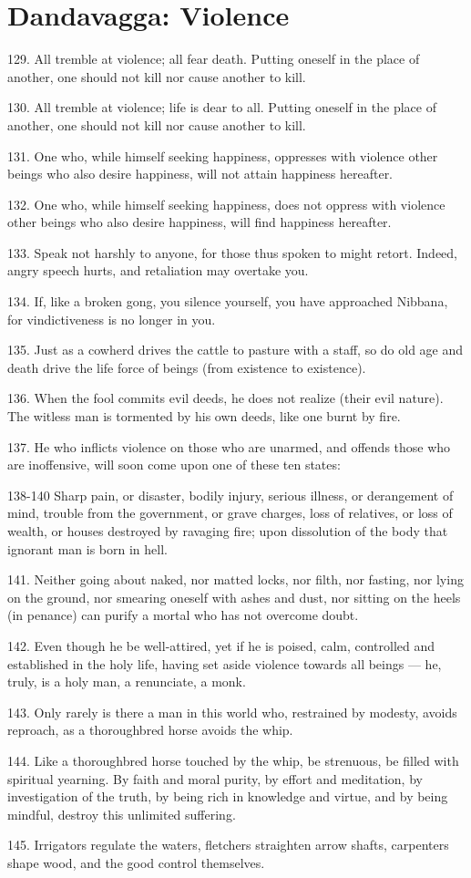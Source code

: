\newpage
\chapter{Dandavagga: Violence}

129. All tremble at violence; all fear death. Putting oneself in the place of another, one should not kill nor cause another to kill.

130. All tremble at violence; life is dear to all. Putting oneself in the place of another, one should not kill nor cause another to kill.

131. One who, while himself seeking happiness, oppresses with violence other beings who also desire happiness, will not attain happiness hereafter.

132. One who, while himself seeking happiness, does not oppress with violence other beings who also desire happiness, will find happiness hereafter.

133. Speak not harshly to anyone, for those thus spoken to might retort. Indeed, angry speech hurts, and retaliation may overtake you.

134. If, like a broken gong, you silence yourself, you have approached Nibbana, for vindictiveness is no longer in you.

135. Just as a cowherd drives the cattle to pasture with a staff, so do old age and death drive the life force of beings (from existence to existence).

136. When the fool commits evil deeds, he does not realize (their evil nature). The witless man is tormented by his own deeds, like one burnt by fire.

137. He who inflicts violence on those who are unarmed, and offends those who are inoffensive, will soon come upon one of these ten states:

138-140 Sharp pain, or disaster, bodily injury, serious illness, or derangement of mind, trouble from the government, or grave charges, loss of relatives, or loss of wealth, or houses destroyed by ravaging fire; upon dissolution of the body that ignorant man is born in hell.

141. Neither going about naked, nor matted locks, nor filth, nor fasting, nor lying on the ground, nor smearing oneself with ashes and dust, nor sitting on the heels (in penance) can purify a mortal who has not overcome doubt.

142. Even though he be well-attired, yet if he is poised, calm, controlled and established in the holy life, having set aside violence towards all beings — he, truly, is a holy man, a renunciate, a monk.

143. Only rarely is there a man in this world who, restrained by modesty, avoids reproach, as a thoroughbred horse avoids the whip.

144. Like a thoroughbred horse touched by the whip, be strenuous, be filled with spiritual yearning. By faith and moral purity, by effort and meditation, by investigation of the truth, by being rich in knowledge and virtue, and by being mindful, destroy this unlimited suffering.

145. Irrigators regulate the waters, fletchers straighten arrow shafts, carpenters shape wood, and the good control themselves.

